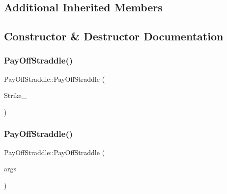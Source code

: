 \subsection*{Additional Inherited Members}


\subsection{Constructor \& Destructor Documentation}
\hypertarget{classPayOffStraddle_af15fc09a267a262f5be7c7d336a5577d}{}\label{classPayOffStraddle_af15fc09a267a262f5be7c7d336a5577d} 
\subsubsection{\texorpdfstring{Pay\+Off\+Straddle()}{PayOffStraddle()}\hspace{0.1cm}{\footnotesize\ttfamily [1/2]}}
{\footnotesize\ttfamily Pay\+Off\+Straddle\+::\+Pay\+Off\+Straddle (\begin{DoxyParamCaption}\item[{double}]{Strike\+\_\+ }\end{DoxyParamCaption})}

\hypertarget{classPayOffStraddle_a3ef92eb2545ae6651b9ff85759dac1c8}{}\label{classPayOffStraddle_a3ef92eb2545ae6651b9ff85759dac1c8} 
\subsubsection{\texorpdfstring{Pay\+Off\+Straddle()}{PayOffStraddle()}\hspace{0.1cm}{\footnotesize\ttfamily [2/2]}}
{\footnotesize\ttfamily Pay\+Off\+Straddle\+::\+Pay\+Off\+Straddle (\begin{DoxyParamCaption}\item[{const \hyperlink{classMJArray}{M\+J\+Array} \&}]{args }\end{DoxyParamCaption})}

\hypertarget{classPayOffStraddle_a444cbd48a0d5b654a9d82f92427fb882}{}\label{classPayOffStraddle_a444cbd48a0d5b654a9d82f92427fb882} 

